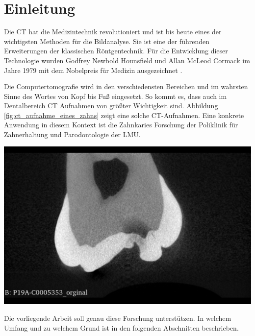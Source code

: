 \chapter{Einleitung}
\label{chap:einleitung} Die \ac{CT} hat die Medizintechnik revolutioniert und
ist bis heute eines der wichtigsten Methoden für die Bildanalyse. Sie ist eine der
führenden Erweiterungen der klassischen Röntgentechnik. Für die Entwicklung
dieser Technologie wurden Godfrey Newbold Hounsfield und Allan McLeod Cormack im
Jahre 1979 mit dem Nobelpreis für Medizin ausgezeichnet \citep[Seite12]{handels2000}.

\begin{minipage}{0.45\textwidth}
	Die Computertomografie wird in den verschiedensten Bereichen und im wahrsten Sinne
	des Wortes von Kopf bis Fuß eingesetzt. So kommt es, dass auch im Dentalbereich
	CT Aufnahmen von größter Wichtigkeit sind. Abbildung
	\ref{fig:ct_aufnahme_eines_zahns} zeigt eine solche CT-Aufnahmen. Eine konkrete
	Anwendung in diesem Kontext ist die Zahnkaries Forschung der Poliklinik für Zahnerhaltung
	und Parodontologie der \ac{LMU}.
\end{minipage}
\hfill
\begin{minipage}{0.45\textwidth}
	\centering
	\includegraphics[scale=0.2, width=\textwidth]{img/micro_ct_orginal.jpg}
	 \label{fig:ct_aufnahme_eines_zahns}
\end{minipage}

Die vorliegende Arbeit soll genau diese Forschung unterstützen. In welchem
Umfang und zu welchem Grund ist in den folgenden Abschnitten beschrieben.

